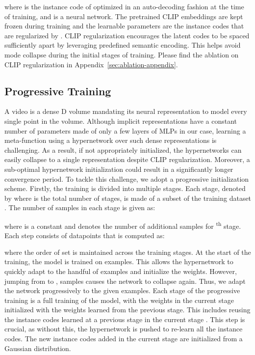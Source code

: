 \documentclass[10pt]{article} \usepackage[accepted]{tmlr}
\begin{document}
where  is the instance code of  optimized in an auto-decoding fashion at the time of training, and  is a neural network. The pretrained CLIP embeddings are kept frozen during training and the learnable parameters are the instance codes  that are regularized by . CLIP regularization encourages the latent codes to be spaced sufficiently apart by leveraging predefined semantic encoding. This helps avoid mode collapse during the initial stages of training. 
Please find the ablation on CLIP regularization in Appendix~\ref{sec:ablation-appendix}.

\subsection{Progressive Training}
\label{sec:progressive-training}

A video is a dense D volume mandating its neural representation to model every single point in the volume. Although implicit representations have a constant number of parameters made of only a few layers of MLPs in our case, learning a meta-function using a hypernetwork over such dense representations is challenging. As a result, if not appropriately initialized, the hypernetworks can easily collapse to a single representation despite CLIP regularization. Moreover, a sub-optimal hypernetwork initialization could result in a significantly longer convergence period. To tackle this challenge, we adopt a progressive initialization scheme. Firstly, the training is divided into multiple stages. Each stage, denoted by  where  is the total number of stages, is made of a subset of the training dataset . The number of samples  in each stage  is given as:

where  is a constant and  denotes the number of additional samples for \textsuperscript{th} stage. Each step  consists of  datapoints that is computed as:

where the order of set  is maintained across the training stages. At the start of the training, the model is trained on  examples. This allows the hypernetwork to quickly adapt to the handful of examples and initialize the weights. However, jumping from  to , samples causes the network to collapse again. Thus, we adapt the network progressively to the given examples. Each stage of the progressive training is a full training of the model, with the weights in the current stage initialized with the weights learned from the previous stage. 
This includes reusing the instance codes  learned at a previous stage  in the current stage . This step is crucial, as without this, the hypernetwork is pushed to re-learn all the instance codes. 
The new instance codes added in the current stage are initialized from a Gaussian distribution.
\end{document}
